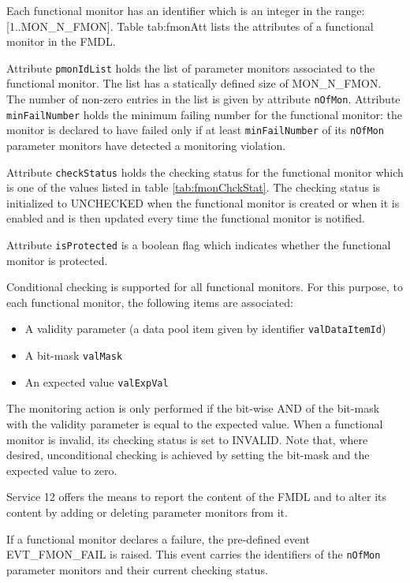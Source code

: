 \documentclass{pnp_article}
\begin{document}
Each functional monitor has an identifier which is an integer in the range: [1..MON\_N\_FMON].  Table {tab:fmonAtt} lists the attributes of a functional monitor in the FMDL.

Attribute \texttt{pmonIdList} holds the list of parameter monitors associated to the functional monitor. The list has a statically defined size of MON\_N\_FMON. The number of non-zero entries in the list is given by attribute \texttt{nOfMon}. Attribute \texttt{minFailNumber} holds the minimum failing number for the functional monitor: the monitor is declared to have failed only if at least \texttt{minFailNumber} of its \texttt{nOfMon} parameter monitors have detected a monitoring violation.

Attribute \texttt{checkStatus} holds the checking status for the functional monitor which is one of the values listed in table \ref{tab:fmonChckStat}. The checking status is initialized to UNCHECKED when the functional monitor is created or when it is enabled and is then updated every time the functional monitor is notified.

Attribute \texttt{isProtected} is a boolean flag which indicates whether the functional monitor is protected.

Conditional checking is supported for all functional monitors. For this purpose, to each functional monitor, the following items are associated: 

\begin{itemize}
\item A validity parameter (a data pool item given by identifier \texttt{valDataItemId})
\item A bit-mask \texttt{valMask}
\item An expected value \texttt{valExpVal}
\end{itemize}

The monitoring action is only performed if the bit-wise AND of the bit-mask with the validity parameter is equal to the expected value. When a functional monitor is invalid, its checking status is set to INVALID. Note that, where desired, unconditional checking is achieved by setting the bit-mask and the expected value to zero.

Service 12 offers the means to report the content of the FMDL and to alter its content by adding or deleting parameter monitors from it.

If a functional monitor declares a failure, the pre-defined event EVT\_FMON\_FAIL is raised. This event carries the identifiers of the \texttt{nOfMon} parameter monitors and their current checking status.
\end{document}
